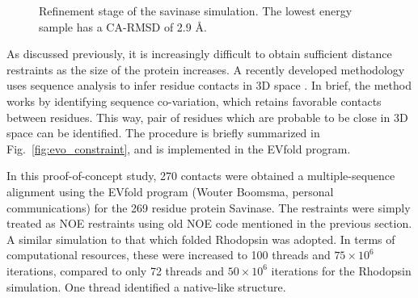 \begin{figure}%
    \centering
    \caption{Refinement stage of the savinase simulation. The lowest energy sample has a CA-RMSD of 2.9 \AA. }
    \label{fig:savinase_fold}%
\end{figure}


As discussed previously, it is increasingly difficult to obtain sufficient distance restraints as the size of the protein increases.
A recently developed methodology uses sequence analysis to infer residue contacts in 3D space \cite{evfold}.
In brief, the method works by identifying sequence co-variation, which retains favorable contacts between residues.
This way, pair of residues which are probable to be close in 3D space can be identified.
The procedure is briefly summarized in Fig.~\ref{fig:evo_constraint}, and is implemented in the EVfold program.

In this proof-of-concept study, 270 contacts were obtained a multiple-sequence alignment using the EVfold program (Wouter Boomsma, personal communications) for the 269 residue protein Savinase.
The restraints were simply treated as NOE restraints using old NOE code mentioned in the previous section.
A similar simulation to that which folded Rhodopsin was adopted. 
In terms of computational resources, these were increased to 100 threads and $75 \times 10^6$ iterations, compared to only 72 threads and $50 \times 10^6$ iterations for the Rhodopsin simulation.
One thread identified a native-like structure.

